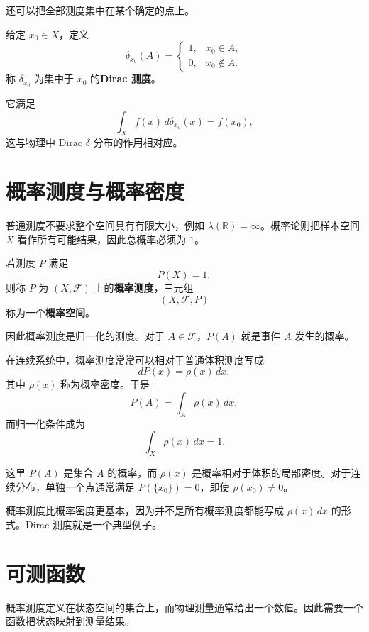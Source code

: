 \documentclass[UTF8,a4paper,11pt,openany]{ctexbook}
\begin{document}
还可以把全部测度集中在某个确定的点上。

\begin{definition}[Dirac 测度]
给定 $x_0\in X$，定义
\[
\delta_{x_0}(A)
=
\begin{cases}
    1, & x_0\in A,\\
    0, & x_0\notin A.
\end{cases}
\]
称 $\delta_{x_0}$ 为集中于 $x_0$ 的\textbf{Dirac 测度}。
\end{definition}

它满足
\[
\int_X f(x)\,d\delta_{x_0}(x)=f(x_0),
\]
这与物理中 Dirac $\delta$ 分布的作用相对应。

\section{概率测度与概率密度}

普通测度不要求整个空间具有有限大小，例如 $\lambda(\mathbb R)=\infty$。概率论则把样本空间 $X$ 看作所有可能结果，因此总概率必须为 $1$。

\begin{definition}[概率测度与概率空间]
若测度 $P$ 满足
\[
P(X)=1,
\]
则称 $P$ 为 $(X,\mathcal F)$ 上的\textbf{概率测度}，三元组
\[
(X,\mathcal F,P)
\]
称为一个\textbf{概率空间}。
\end{definition}

因此概率测度是归一化的测度。对于 $A\in\mathcal F$，$P(A)$ 就是事件 $A$ 发生的概率。

在连续系统中，概率测度常常可以相对于普通体积测度写成
\[
dP(x)=\rho(x)\,dx,
\]
其中 $\rho(x)$ 称为概率密度。于是
\begin{equation}
    P(A)=\int_A\rho(x)\,dx,
\end{equation}
而归一化条件成为
\[
\int_X\rho(x)\,dx=1.
\]

这里 $P(A)$ 是集合 $A$ 的概率，而 $\rho(x)$ 是概率相对于体积的局部密度。对于连续分布，单独一个点通常满足 $P(\{x_0\})=0$，即使 $\rho(x_0)\neq0$。

概率测度比概率密度更基本，因为并不是所有概率测度都能写成 $\rho(x)\,dx$ 的形式。Dirac 测度就是一个典型例子。

\section{可测函数}

概率测度定义在状态空间的集合上，而物理测量通常给出一个数值。因此需要一个函数把状态映射到测量结果。
\end{document}
